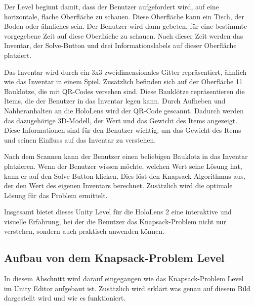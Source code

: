 Der Level beginnt damit, dass der Benutzer aufgefordert wird, auf eine
horizontale, flache Oberfläche zu schauen. Diese Oberfläche kann ein Tisch,
der Boden oder ähnliches sein. Der Benutzer wird dann gebeten, für eine bestimmte
vorgegebene Zeit auf diese Oberfläche zu schauen. Nach dieser Zeit werden das Inventar,
der Solve-Button und drei Informationslabels auf dieser Oberfläche platziert.

Das Inventar wird durch ein 3x3 zweidimensionales Gitter repräsentiert, ähnlich
wie das Inventar in einem Spiel. Zusätzlich befinden sich auf der Oberfläche 11 Bauklötze,
die mit QR-Codes versehen sind. Diese Bauklötze repräsentieren die Items, die der Benutzer
in das Inventar legen kann. Durch Aufheben und Nahheranhalten an die HoloLens wird der QR-Code gescannt.
Dadurch werden das dazugehörige 3D-Modell, der Wert und das Gewicht des Items angezeigt.
Diese Informationen sind für den Benutzer wichtig, um das Gewicht des Items und
seinen Einfluss auf das Inventar zu verstehen.

Nach dem Scannen kann der Benutzer einen beliebigen Bauklotz in das Inventar platzieren.
Wenn der Benutzer wissen möchte, welchen Wert seine Lösung hat, kann er auf den Solve-Button
klicken. Dies löst den Knapsack-Algorithmus aus, der den Wert des eigenen Inventars berechnet.
Zusätzlich wird die optimale Lösung für das Problem ermittelt.

Insgesamt bietet dieses Unity Level für die HoloLens 2 eine interaktive und visuelle Erfahrung,
bei der die Benutzer das Knapsack-Problem nicht nur verstehen, sondern auch praktisch anwenden können.

\subsection{Aufbau von dem Knapsack-Problem Level}
In diesem Abschnitt wird darauf eingegangen wie das Knapsack-Problem Level im Unity Editor aufgebaut ist.
Zusätzlich wird erklärt was genau auf diesem Bild dargestellt wird und wie es funktioniert.\\

